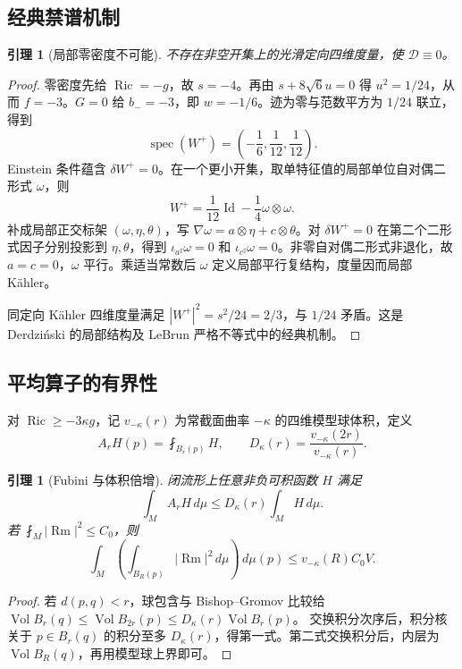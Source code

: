 \documentclass[UTF8,fontset=fandol,zihao=-4]{ctexart}
\theoremstyle{cn}
\newtheorem{lemma}[theorem]{引理}
\DeclareMathOperator{\Ric}{Ric}
\DeclareMathOperator{\Rm}{Rm}
\DeclareMathOperator{\Vol}{Vol}
\DeclareMathOperator{\Id}{Id}
\newcommand{\dd}{\,d\mu}
\newcommand{\av}{\fint}
\newcommand{\Dcal}{\mathcal D}
\numberwithin{equation}{section}
\begin{document}
\subsection{经典禁谱机制}

\begin{lemma}[局部零密度不可能]\label{lem:forbidden}
不存在非空开集上的光滑定向四维度量，使 $\Dcal\equiv0$。
\end{lemma}
\begin{proof}
零密度先给 $\Ric=-g$，故 $s=-4$。再由 $s+8\sqrt6u=0$ 得 $u^2=1/24$，从而 $f=-3$。$G=0$ 给 $b_-=-3$，即 $w=-1/6$。迹为零与范数平方为 $1/24$ 联立，得到
\begin{equation}\label{eq:forbidden-spectrum}
\operatorname{spec}(W^+)=\left(-\frac16,\frac1{12},\frac1{12}\right).
\end{equation}
Einstein 条件蕴含 $\delta W^+=0$。在一个更小开集，取单特征值的局部单位自对偶二形式 $\omega$，则
\[
W^+=\frac1{12}\Id-\frac14\omega\otimes\omega.
\]
补成局部正交标架 $(\omega,\eta,\theta)$，写 $\nabla\omega=a\otimes\eta+c\otimes\theta$。对 $\delta W^+=0$ 在第二个二形式因子分别投影到 $\eta,\theta$，得到 $\iota_{a^\sharp}\omega=0$ 和 $\iota_{c^\sharp}\omega=0$。非零自对偶二形式非退化，故 $a=c=0$，$\omega$ 平行。乘适当常数后 $\omega$ 定义局部平行复结构，度量因而局部 Kähler。

同定向 Kähler 四维度量满足 $|W^+|^2=s^2/24=2/3$，与 $1/24$ 矛盾。这是 Derdziński 的局部结构及 LeBrun 严格不等式中的经典机制\cite{derd,lebrun2004}。
\end{proof}

\subsection{平均算子的有界性}

对 $\Ric\ge-3\kappa g$，记 $v_{-\kappa}(r)$ 为常截面曲率 $-\kappa$ 的四维模型球体积，定义
\[
A_rH(p)=\av_{B_r(p)}H,\qquad
D_\kappa(r)=\frac{v_{-\kappa}(2r)}{v_{-\kappa}(r)}.
\]
\begin{lemma}[Fubini 与体积倍增]\label{lem:fubini}
闭流形上任意非负可积函数 $H$ 满足
\begin{equation}\label{eq:average-fubini}
\int_M A_rH\dd\le D_\kappa(r)\int_MH\dd.
\end{equation}
若 $\av_M|\Rm|^2\le C_0$，则
\begin{equation}\label{eq:absolute-fubini}
\int_M\left(\int_{B_R(p)}|\Rm|^2\dd\right)\dd(p)
\le v_{-\kappa}(R)C_0V.
\end{equation}
\end{lemma}
\begin{proof}
若 $d(p,q)<r$，球包含与 Bishop--Gromov 比较给
$\Vol B_r(q)\le\Vol B_{2r}(p)\le D_\kappa(r)\Vol B_r(p)$。
交换积分次序后，积分核关于 $p\in B_r(q)$ 的积分至多 $D_\kappa(r)$，得第一式。第二式交换积分后，内层为 $\Vol B_R(q)$，再用模型球上界即可。
\end{proof}
\end{document}
